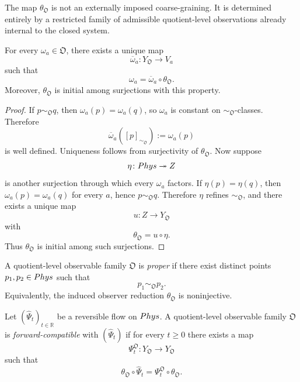\begin{remark}[Internality]
	The map \(\theta_{\mathfrak O}\) is not an externally imposed
	coarse-graining. It is determined entirely by a restricted family of
	admissible quotient-level observations already internal to the closed
	system.
\end{remark}
\begin{proposition}
	For every \(\omega_a\in\mathfrak O\), there exists a unique map
	\[
		\overline\omega_a\colon Y_{\mathfrak O}\to V_a
	\]
	such that
	\[
		\omega_a=\overline\omega_a\circ\theta_{\mathfrak O}.
	\]
	Moreover, \(\theta_{\mathfrak O}\) is initial among surjections with
	this property.
\end{proposition}
\begin{proof}
	If \(p\sim_{\mathfrak O}q\), then \(\omega_a(p)=\omega_a(q)\), so
	\(\omega_a\) is constant on \(\sim_{\mathfrak O}\)-classes. Therefore
	\[
		\overline\omega_a([p]_{\sim_{\mathfrak O}}):=\omega_a(p)
	\]
	is well defined. Uniqueness follows from surjectivity of
	\(\theta_{\mathfrak O}\).
	Now suppose
	\[
		\eta\colon Phys\twoheadrightarrow Z
	\]
	is another surjection through which every \(\omega_a\) factors. If
	\(\eta(p)=\eta(q)\), then \(\omega_a(p)=\omega_a(q)\) for every \(a\),
	hence \(p\sim_{\mathfrak O}q\). Therefore \(\eta\) refines
	\(\sim_{\mathfrak O}\), and there exists a unique map
	\[
		u\colon Z\to Y_{\mathfrak O}
	\]
	with
	\[
		\theta_{\mathfrak O}=u\circ\eta.
	\]
	Thus \(\theta_{\mathfrak O}\) is initial among such surjections.
\end{proof}
\begin{definition}
	A quotient-level observable family \(\mathfrak O\) is \emph{proper} if
	there exist distinct points \(p_1,p_2\in Phys\) such that
	\[
		p_1\sim_{\mathfrak O}p_2.
	\]
	Equivalently, the induced observer reduction
	\(\theta_{\mathfrak O}\) is noninjective.
\end{definition}
\begin{definition}
	Let \((\widehat\Psi_t)_{t\in\mathbb R}\) be a reversible flow on
	\(Phys\). A quotient-level observable family \(\mathfrak O\) is
	\emph{forward-compatible} with \((\widehat\Psi_t)\) if for every
	\(t\ge0\) there exists a map
	\[
		\Psi_t^{\mathfrak O}\colon Y_{\mathfrak O}\to Y_{\mathfrak O}
	\]
	such that
	\[
		\theta_{\mathfrak O}\circ\widehat\Psi_t
		=
		\Psi_t^{\mathfrak O}\circ\theta_{\mathfrak O}.
	\]
\end{definition}
